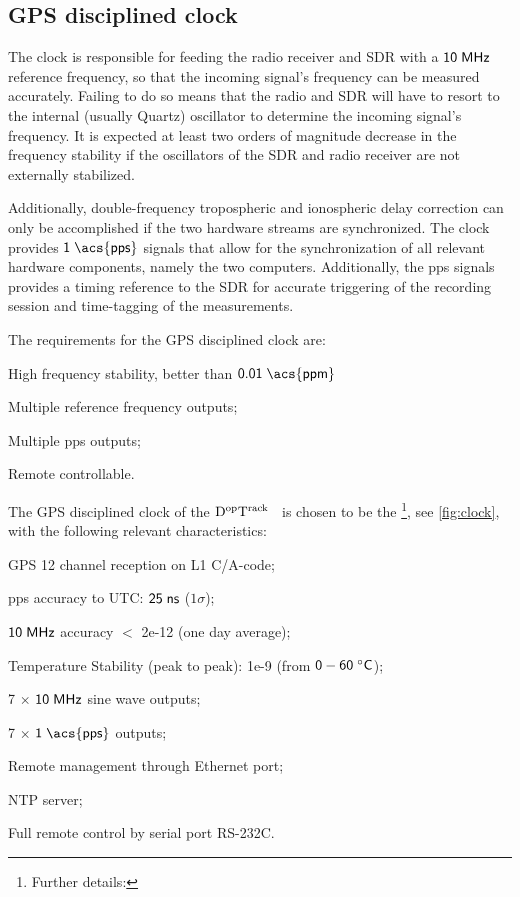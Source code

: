 \documentclass[11pt,a4paper,oneside]{article}
\newcommand{\GroundStationName}{${\rm D^{\rm op}T^{\rm rack}}$}
\newcommand{\listskip}{0pt}
\newenvironment{itemize*}
{\begin{itemize}
  \setlength{\itemsep}{\listskip}
  \setlength{\parskip}{\listskip}
  \setlength{\parsep}{\listskip}}
{\end{itemize}}
\newcommand{\unit}[2]{$ {\sf #1}\thickspace{\sf #2}$}
\begin{document}
\subsection{\acs{GPS} disciplined clock}

The clock is responsible for feeding the radio receiver and \ac{SDR} with a \unit{10}{MHz} reference frequency, so that the incoming signal's frequency can be measured accurately. Failing to do so means that the radio and \ac{SDR} will have to resort to the internal (usually Quartz) oscillator to determine the incoming signal's frequency. It is expected at least two orders of magnitude decrease in the frequency stability if the oscillators of the \ac{SDR} and radio receiver are not externally stabilized.

Additionally, double-frequency tropospheric and ionospheric delay correction can only be accomplished if the two hardware streams are synchronized. The clock provides \unit{1}{\acs{pps}} signals that allow for the synchronization of all relevant hardware components, namely the two computers. Additionally, the \ac{pps} signals provides a timing reference to the \ac{SDR} for accurate triggering of the recording session and time-tagging of the measurements.

The requirements for the \acs{GPS} disciplined clock are:

\begin{itemize*}
\item High frequency stability, better than \unit{0.01}{\acs{ppm}}
\item Multiple reference frequency outputs;
\item Multiple \ac{pps} outputs;
\item Remote controllable.
\end{itemize*}

The \acs{GPS} disciplined clock of the \GroundStationName~ is chosen to be the \footnote{Further details: }, see \ref{fig:clock}, with the following relevant characteristics:

\begin{itemize*}
\item \ac{GPS} 12 channel reception on \ac{L1} \ac{C/A-code};
\item \ac{pps} accuracy to \ac{UTC}: \unit{25}{ns} ($1\sigma$);
\item \unit{10}{MHz} accuracy $<$ 2e-12 (one day average);
\item Temperature Stability (peak to peak): 1e-9 (from \unit{0 - 60}{^\circ C});
\item 7 $\times$ \unit{10}{MHz} sine wave outputs;
\item 7 $\times$ \unit{1}{\acs{pps}} outputs;
\item Remote management through Ethernet port;
\item \ac{NTP} server;
\item Full remote control by serial port RS-232C.
\end{itemize*}
\end{document}

